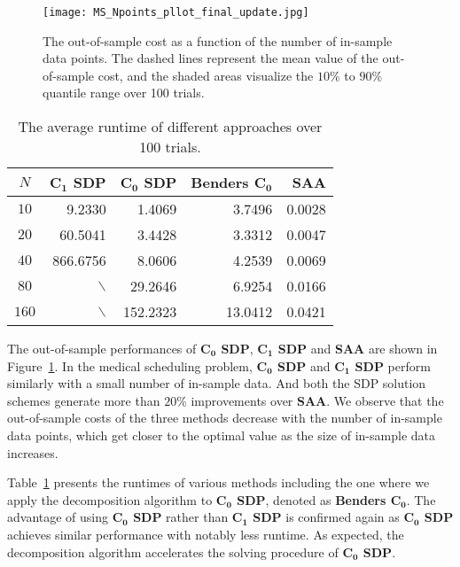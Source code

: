 \documentclass{article}
\begin{document}
  	\begin{figure}[t!]
		\texttt{[image: MS\_Npoints\_pllot\_final\_update.jpg]}
		\caption{The out-of-sample cost as a function of the number of in-sample data points. The dashed lines represent the mean value of the out-of-sample cost, and the shaded areas visualize the $10\%$ to $90\%$ quantile range over 100 trials.}
	        \label{fig:MS_performance}
 	\end{figure}
 	
\begin{table}[t!]
\color{black}
\centering
\begin{tabular}{|c|rrrr|}\hline
$N$  & \textbf{$\mathbf{C_1}$ SDP}  & \textbf{$\mathbf{C_0}$ SDP} &  \textbf{Benders $\mathbf{C_0}$} & \textbf{SAA} \\
[0.0mm] \hline
$10$  & 9.2330 & 1.4069 & 3.7496 & 0.0028\\
$20$  & 60.5041 & 3.4428 & 3.3312 & 0.0047\\
$40$ &  866.6756 & 8.0606 & 4.2539 & 0.0069\\ 
$80$ &  $\backslash$ & 29.2646 & 6.9254 & 0.0166\\
$160$ & $\backslash$ & 152.2323 & 13.0412 & 0.0421\\
\hline\hline
\end{tabular}
\caption[]{The average runtime of different approaches over 100 trials.}
\label{tbl:MS_runtime}
\end{table}

The out-of-sample performances of \textbf{$\mathbf{C_0}$ SDP}, \textbf{$\mathbf{C_1}$ SDP} and \textbf{SAA} are shown in Figure~\ref{fig:MS_performance}. In the medical scheduling problem, \textbf{$\mathbf{C_0}$ SDP} and \textbf{$\mathbf{C_1}$ SDP} perform similarly with a small number of in-sample data. And both the SDP solution schemes generate more than $20\%$ improvements over $\textbf{SAA}$. We observe that the out-of-sample costs of the three methods decrease with the number of in-sample data points, which get closer to the optimal value as the size of in-sample data increases.

Table~\ref{tbl:MS_runtime} presents the runtimes of various methods including the one where we apply the decomposition algorithm to \textbf{$\mathbf{C_0}$ SDP}, denoted as \textbf{Benders $\mathbf{C_0}$}. The advantage of using \textbf{$\mathbf{C_0}$ SDP} rather than \textbf{$\mathbf{C_1}$ SDP} is confirmed again as \textbf{$\mathbf{C_0}$ SDP} achieves similar performance with notably less runtime. As expected, the decomposition algorithm accelerates the solving procedure of \textbf{$\mathbf{C_0}$ SDP}. 
\end{document}
